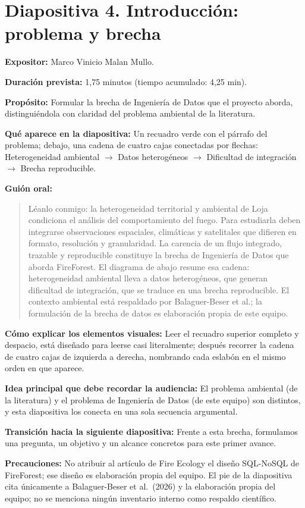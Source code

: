 \documentclass[11pt,a4paper]{article}
\newcommand{\campo}[2]{\par\medskip\noindent\textbf{#1:} #2\par}
\newenvironment{guionoral}{%
  \medskip\noindent\textbf{Gui\'on oral:}\par\smallskip
  \begin{quote}\small
}{%
  \end{quote}
}
\newcommand{\separadordiapositiva}{\bigskip\noindent{\color{Tierra!60}\hrulefill}\bigskip}
\begin{document}
\separadordiapositiva

\section*{Diapositiva 4. Introducci\'on: problema y brecha}

\campo{Expositor}{Marco Vinicio Malan Mullo.}
\campo{Duraci\'on prevista}{1,75 minutos (tiempo acumulado: 4,25 min).}
\campo{Prop\'osito}{Formular la brecha de Ingenier\'ia de Datos que el
proyecto aborda, distingui\'endola con claridad del problema ambiental
de la literatura.}
\campo{Qu\'e aparece en la diapositiva}{Un recuadro verde con el
p\'arrafo del problema; debajo, una cadena de cuatro cajas conectadas
por flechas: Heterogeneidad ambiental $\rightarrow$ Datos
heterog\'eneos $\rightarrow$ Dificultad de integraci\'on $\rightarrow$
Brecha reproducible.}

\begin{guionoral}
L\'eanlo conmigo: la heterogeneidad territorial y ambiental de Loja
condiciona el an\'alisis del comportamiento del fuego. Para
estudiarla deben integrarse observaciones espaciales, clim\'aticas y
satelitales que difieren en formato, resoluci\'on y granularidad. La
carencia de un flujo integrado, trazable y reproducible constituye la
brecha de Ingenier\'ia de Datos que aborda FireForest. El diagrama de
abajo resume esa cadena: heterogeneidad ambiental lleva a datos
heterog\'eneos, que generan dificultad de integraci\'on, que se
traduce en una brecha reproducible. El contexto ambiental est\'a
respaldado por Balaguer-Beser et al.; la formulaci\'on de la brecha de
datos es elaboraci\'on propia de este equipo.
\end{guionoral}

\campo{C\'omo explicar los elementos visuales}{Leer el recuadro
superior completo y despacio, est\'a dise\~nado para leerse casi
literalmente; despu\'es recorrer la cadena de cuatro cajas de izquierda
a derecha, nombrando cada eslab\'on en el mismo orden en que aparece.}
\campo{Idea principal que debe recordar la audiencia}{El problema
ambiental (de la literatura) y el problema de Ingenier\'ia de Datos
(de este equipo) son distintos, y esta diapositiva los conecta en una
sola secuencia argumental.}
\campo{Transici\'on hacia la siguiente diapositiva}{Frente a esta
brecha, formulamos una pregunta, un objetivo y un alcance concretos
para este primer avance.}
\campo{Precauciones}{No atribuir al art\'iculo de Fire Ecology el
dise\~no SQL-NoSQL de FireForest; ese dise\~no es elaboraci\'on propia
del equipo. El pie de la diapositiva cita \'unicamente a
Balaguer-Beser et al.\ (2026) y la elaboraci\'on propia del equipo; no
se menciona ning\'un inventario interno como respaldo cient\'ifico.}
\end{document}
